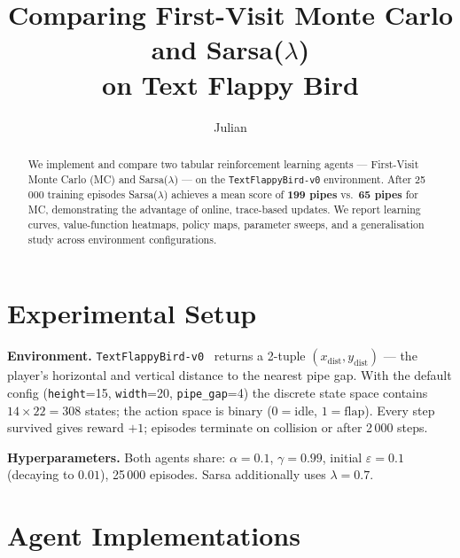 \documentclass[runningheads]{llncs}
\begin{document}
\title{Comparing First-Visit Monte Carlo and Sarsa($\lambda$)\\
       on Text Flappy Bird}

\author{Julian}

\maketitle

\begin{abstract}
We implement and compare two tabular reinforcement learning agents —
First-Visit Monte Carlo (MC) and Sarsa($\lambda$) — on the
\texttt{TextFlappyBird-v0} environment.
After 25\,000 training episodes Sarsa($\lambda$) achieves a mean score of
\textbf{199 pipes} vs.\ \textbf{65 pipes} for MC, demonstrating the advantage
of online, trace-based updates.
We report learning curves, value-function heatmaps, policy maps, parameter
sweeps, and a generalisation study across environment configurations.
\end{abstract}

\section{Experimental Setup}

\textbf{Environment.}
\texttt{TextFlappyBird-v0}~\cite{christodoulidis2023tfb} returns a 2-tuple
$(x_\text{dist}, y_\text{dist})$ — the player's horizontal and vertical
distance to the nearest pipe gap.
With the default config (\texttt{height}=15, \texttt{width}=20,
\texttt{pipe\_gap}=4) the discrete state space contains $14\!\times\!22=308$
states; the action space is binary ($0=\text{idle}$, $1=\text{flap}$).
Every step survived gives reward $+1$; episodes terminate on collision or
after 2\,000 steps.

\textbf{Hyperparameters.}
Both agents share: $\alpha=0.1$, $\gamma=0.99$, initial
$\varepsilon=0.1$ (decaying to $0.01$), 25\,000 episodes.
Sarsa additionally uses $\lambda=0.7$.

\section{Agent Implementations}
\end{document}
